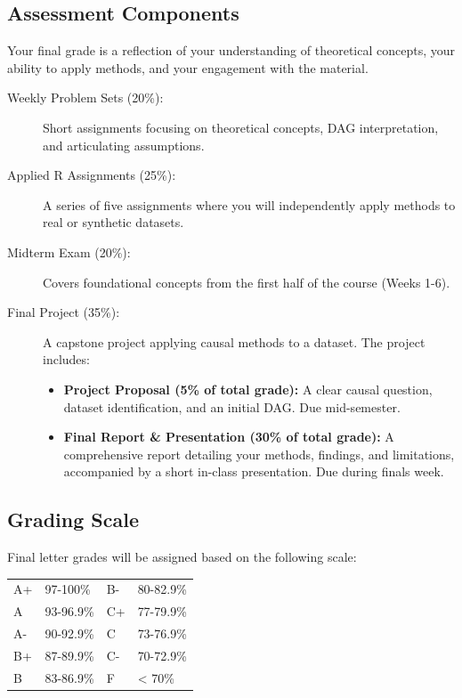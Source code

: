 \documentclass[11pt]{article}
\begin{document}
\subsection*{Assessment Components}
Your final grade is a reflection of your understanding of theoretical concepts, your ability to apply methods, and your engagement with the material.
\begin{description}
  \item[Weekly Problem Sets (20\%):] Short assignments focusing on theoretical concepts, DAG interpretation, and articulating assumptions.
  \item[Applied R Assignments (25\%):] A series of five assignments where you will independently apply methods to real or synthetic datasets.
  \item[Midterm Exam (20\%):] Covers foundational concepts from the first half of the course (Weeks 1-6).
  \item[Final Project (35\%):] A capstone project applying causal methods to a dataset. The project includes:
    \begin{itemize}
      \item[] \textbf{Project Proposal (5\% of total grade):} A clear causal question, dataset identification, and an initial DAG. Due mid-semester.
      \item[] \textbf{Final Report \& Presentation (30\% of total grade):} A comprehensive report detailing your methods, findings, and limitations, accompanied by a short in-class presentation. Due during finals week.
    \end{itemize}
\end{description}

\vspace{6mm}
\subsection*{Grading Scale}
Final letter grades will be assigned based on the following scale:
\begin{center}
  \begin{tabular}{ll@{\hskip 2em}ll}
    A+ & 97-100\% & B- & 80-82.9\% \\
    A  & 93-96.9\% & C+ & 77-79.9\% \\
    A- & 90-92.9\% & C  & 73-76.9\% \\
    B+ & 87-89.9\% & C- & 70-72.9\% \\
    B  & 83-86.9\% & F  & < 70\% \\
  \end{tabular}
\end{center}
\end{document}
